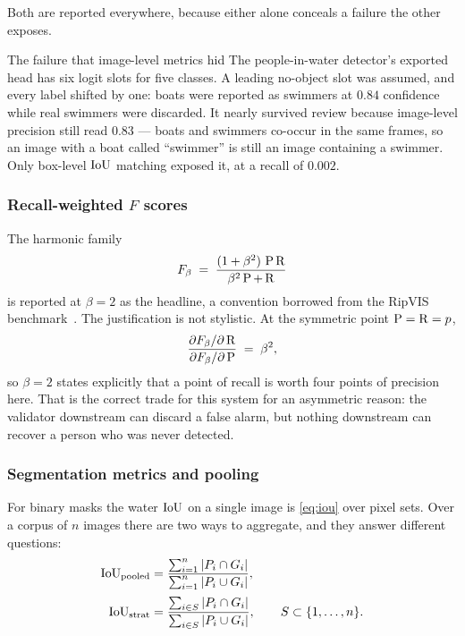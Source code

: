 Both are reported everywhere, because either alone conceals a failure the
other exposes.

\begin{recorded}{The failure that image-level metrics hid}
The people-in-water detector's exported head has six logit slots for five
classes. A leading no-object slot was assumed, and every label shifted by one:
boats were reported as swimmers at $0.84$ confidence while real swimmers were
discarded. It nearly survived review because image-level precision still read
$0.83$ — boats and swimmers co-occur in the same frames, so an image with a
boat called ``swimmer'' is still an image containing a swimmer. Only
box-level $\operatorname{IoU}$ matching exposed it, at a recall of $0.002$.
\end{recorded}

\subsubsection{Recall-weighted \texorpdfstring{$F$}{F} scores}

The harmonic family
\begin{equation}
  F_\beta \;=\; \frac{(1 + \beta^{2})\, \operatorname{P} \operatorname{R}}
                     {\beta^{2} \operatorname{P} + \operatorname{R}}
  \label{eq:fbeta}
\end{equation}
is reported at $\beta = 2$ as the headline, a convention borrowed from the
RipVIS benchmark~\citep{ripvis2025}. The justification is not stylistic. At
the symmetric point $\operatorname{P} = \operatorname{R} = p$,
\begin{equation}
  \frac{\partial F_\beta / \partial \operatorname{R}}
       {\partial F_\beta / \partial \operatorname{P}}
  \;=\; \beta^{2},
  \label{eq:fbeta-ratio}
\end{equation}
so $\beta = 2$ states explicitly that a point of recall is worth four points
of precision here. That is the correct trade for this system for an asymmetric
reason: the validator downstream can discard a false alarm, but nothing
downstream can recover a person who was never detected.

\subsubsection{Segmentation metrics and pooling}
\label{sec:pooling}

For binary masks the water $\operatorname{IoU}$ on a single image is \cref{eq:iou} over
pixel sets. Over a corpus of $n$ images there are two ways to aggregate, and
they answer different questions:
\begin{align}
  \operatorname{IoU}_{\text{pooled}} &= \frac{\sum_{i=1}^{n} |P_i \cap G_i|}
                               {\sum_{i=1}^{n} |P_i \cup G_i|},
  \label{eq:iou-pooled} \\[2pt]
  \operatorname{IoU}_{\text{strat}}  &= \frac{\sum_{i \in S} |P_i \cap G_i|}
                               {\sum_{i \in S} |P_i \cup G_i|},
  \qquad S \subset \{1,\dots,n\}.
  \label{eq:iou-strat}
\end{align}

